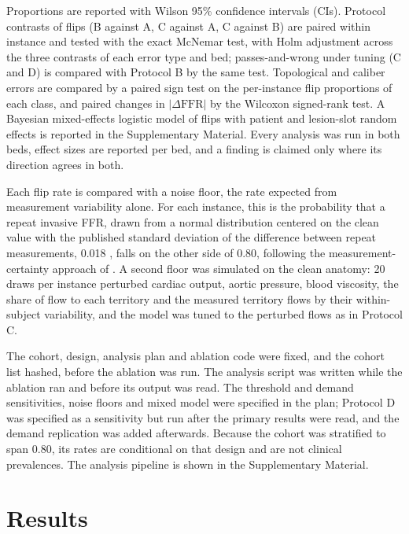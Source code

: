 \documentclass[journal]{IEEEtran}
\begin{document}
Proportions are reported with Wilson 95\% confidence intervals (CIs). Protocol contrasts of flips (B against A, C
against A, C against B) are paired within instance and tested with the exact McNemar test, with Holm adjustment
across the three contrasts of each error type and bed; passes-and-wrong under tuning (C and D) is compared with
Protocol B by the same test. Topological and caliber errors are compared by a paired sign test on
the per-instance flip proportions of each class, and paired changes in $|\Delta\mathrm{FFR}|$ by the Wilcoxon
signed-rank test. A Bayesian mixed-effects logistic model of flips with patient and lesion-slot random effects is reported in the
Supplementary Material. Every analysis was run in both beds, effect sizes are reported per bed, and a finding is
claimed only where its direction agrees in both.

Each flip rate is compared with a noise floor, the rate expected from measurement variability alone. For each instance, this is the probability that a repeat invasive FFR, drawn from a normal
distribution centered on the clean value with the published standard deviation of the difference between repeat measurements, 0.018 \cite{johnson2015}, falls on the other side of 0.80, following the measurement-certainty approach of \cite{petraco2013}. A second floor was simulated on the clean anatomy: 20 draws
per instance perturbed cardiac output, aortic pressure, blood viscosity, the share of flow to each territory and the
measured territory flows by their within-subject variability, and the model was tuned to the perturbed flows as in
Protocol C.

The cohort, design, analysis plan and ablation code were fixed, and the cohort list hashed, before the ablation was run. The analysis script was written while the ablation ran and before its output was read.
The threshold and demand sensitivities, noise floors and mixed model were specified in the plan; Protocol D was
specified as a sensitivity but run after the primary results were read, and the demand replication was added
afterwards. Because the cohort was stratified to span 0.80, its rates are conditional
on that design and are not clinical prevalences. The analysis pipeline is shown in the Supplementary Material.

\section{Results}
\end{document}
